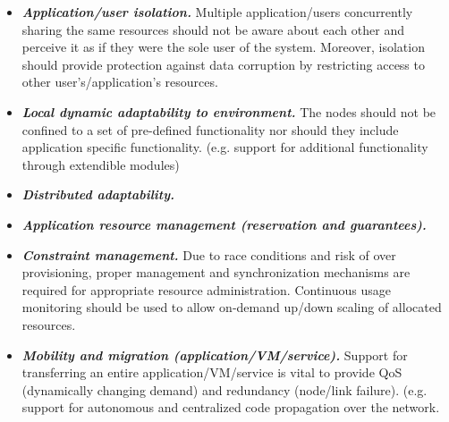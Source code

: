 \begin{itemize}
	\item \textbf{\emph{Application/user isolation.}} Multiple application/users concurrently sharing the same resources should not be aware about each other and perceive it as if they were the sole user of the system. Moreover, isolation should provide protection against data corruption by restricting access to other user's/application's resources.
	
	\item \textbf{\emph{Local dynamic adaptability to environment.}} The nodes should not be confined to a set of pre-defined functionality nor should they include application specific functionality. (e.g. support for additional functionality through extendible modules)
	
	\item \textbf{\emph{Distributed adaptability.}}
	
	\item \textbf{\emph{Application resource management (reservation and guarantees).}}
	
	\item \textbf{\emph{Constraint management.}} Due to race conditions and risk of over provisioning, proper management and synchronization mechanisms are required for appropriate resource administration. Continuous usage monitoring should be used to allow on-demand up/down scaling of allocated resources.
	
	\item \textbf{\emph{Mobility and migration (application/VM/service).}} Support for transferring an entire application/VM/service is vital to provide QoS (dynamically changing demand) and redundancy (node/link failure). (e.g. support for autonomous and centralized code propagation over the network.
\end{itemize}


